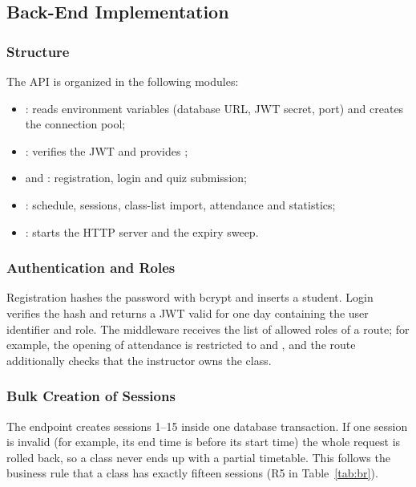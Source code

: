 \subsection{Back-End Implementation}

\subsubsection{Structure}

The API is organized in the following modules:

\begin{itemize}
    \item {}: reads environment variables (database URL, JWT secret, port) and creates the connection pool;
    \item {}: verifies the JWT and provides ;
    \item {} and : registration, login and quiz submission;
    \item {}: schedule, sessions, class-list import, attendance and statistics;
    \item {}: starts the HTTP server and the expiry sweep.
\end{itemize}

\subsubsection{Authentication and Roles}

Registration hashes the password with bcrypt and inserts a student. Login verifies the hash and returns a JWT valid for one day containing the user identifier and role. The middleware  receives the list of allowed roles of a route; for example, the opening of attendance is restricted to  and , and the route additionally checks that the instructor owns the class.

\subsubsection{Bulk Creation of Sessions}

The endpoint  creates sessions 1--15 inside one database transaction. If one session is invalid (for example, its end time is before its start time) the whole request is rolled back, so a class never ends up with a partial timetable. This follows the business rule that a class has exactly fifteen sessions (R5 in Table~\ref{tab:br}).

